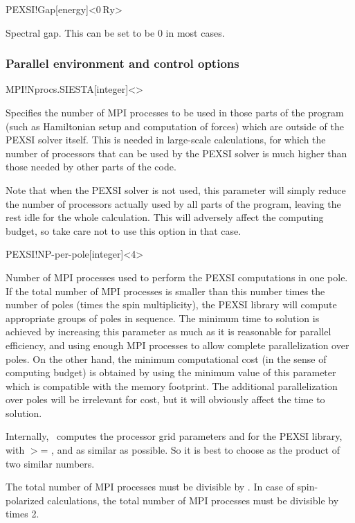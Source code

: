 \begin{fdfentry}{PEXSI!Gap}[energy]<$0\,\mathrm{Ry}$>

  Spectral gap. This can be set to be 0 in most cases.

\end{fdfentry}


\subsubsection{Parallel environment and control options}

\begin{fdfentry}{MPI!Nprocs.SIESTA}[integer]<>

  Specifies the number of MPI processes to be used in those parts of
  the program (such as Hamiltonian setup and computation of forces)
  which are outside of the PEXSI solver itself. This is needed in
  large-scale calculations, for which the number of processors that
  can be used by the PEXSI solver is much higher than those needed by
  other parts of the code.
  
  Note that when the PEXSI solver is not used, this parameter will
  simply reduce the number of processors actually used by all parts of
  the program, leaving the rest idle for the whole calculation. This
  will adversely affect the computing budget, so take care not to use
  this option in that case.
  
\end{fdfentry}

\begin{fdfentry}{PEXSI!NP-per-pole}[integer]<4>

  Number of MPI processes used to perform the PEXSI computations in
  one pole. If the total number of MPI processes is smaller than this
  number times the number of poles (times the spin multiplicity), the
  PEXSI library will compute appropriate groups of poles in
  sequence. The minimum time to solution is achieved by increasing
  this parameter as much as it is reasonable for parallel efficiency,
  and using enough MPI processes to allow complete parallelization
  over poles. On the other hand, the minimum computational cost (in
  the sense of computing budget) is obtained by using the minimum
  value of this parameter which is compatible with the memory
  footprint. The additional parallelization over poles will be
  irrelevant for cost, but it will obviously affect the time to
  solution.

  Internally, \siesta\ computes the processor grid parameters
   and  for the PEXSI library, with
   $>$= , and as similar as possible. So it
  is best to choose  as the product of two
  similar numbers.
  
  \note The total number of MPI processes must be divisible by
  . In case of spin-polarized calculations, the
  total number of MPI processes must be divisible by
   times 2.

\end{fdfentry}

